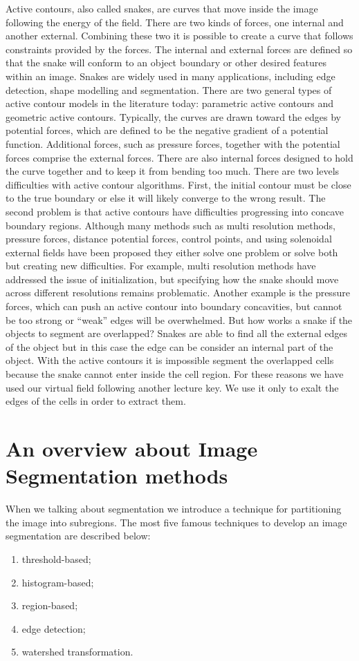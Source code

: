 Active contours, also called snakes, are curves that move inside the image following the energy of the field. There are two kinds of forces, one internal and another external. Combining these two it is possible to create a curve that follows constraints provided by the forces. The  internal  and  external  forces  are  defined  so  that  the  snake  will conform to an object boundary or other desired features within an image. Snakes are widely used  in  many  applications,  including  edge  detection,  shape  modelling and segmentation. There  are  two  general  types  of  active  contour  models  in  the literature  today:  parametric active contours and geometric active contours. Typically,  the  curves  are  drawn  toward  the edges  by  potential  forces,  which  are  defined  to  be  the  negative  gradient  of  a  potential function.  Additional  forces,  such  as  pressure  forces,  together  with  the  potential  forces comprise the external forces. There are also internal forces designed to hold the curve together and to keep it from bending too  much.  There  are  two  levels  difficulties  with  active  contour  algorithms.  First,  the  initial contour must be close to the true boundary or else it will likely converge to the wrong result. The second problem is that active contours have difficulties progressing into concave  boundary  regions.  Although  many  methods  such  as  multi resolution  methods, pressure forces, distance potential forces, control points, and using solenoidal external fields have been proposed they either solve one problem or solve both but creating new difficulties. For  example,  multi resolution  methods  have  addressed  the  issue  of  initialization,  but specifying  how  the  snake  should  move  across  different  resolutions  remains  problematic. Another example is the pressure forces, which can push an active contour into boundary concavities, but cannot be too strong or “weak” edges will be overwhelmed. But how works a snake if the objects to segment are overlapped? Snakes are able to find all the external edges of the object but in this case the edge can be consider an internal part of the object. With the active contours it is impossible segment the overlapped cells because the snake cannot enter inside the cell region. For these reasons we have used our virtual field following another lecture key. We use it only to exalt the edges of the cells in order to extract them.

\section{An overview about Image Segmentation methods}
When we talking about segmentation we introduce a technique for partitioning the image into subregions. The most five famous techniques to develop an image segmentation are described below:
\begin{enumerate}
	\item threshold-based;
	\item histogram-based;
	\item region-based;
	\item edge detection;
	\item watershed transformation.
\end{enumerate}

